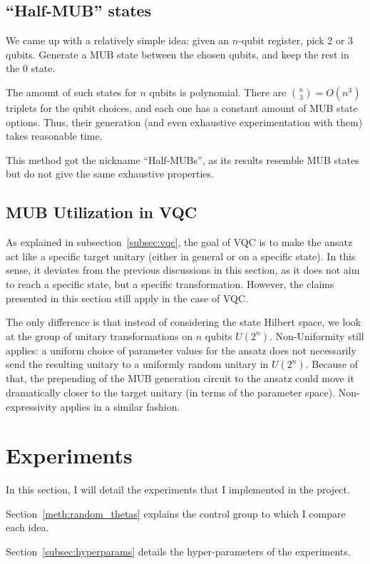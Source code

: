 \documentclass[a4paper,12pt]{article}
\begin{document}
\subsection{``Half-MUB'' states} \label{meth:half_mub}
We came up with a relatively simple idea: given an $n$-qubit register, pick 2 or 3 qubits. Generate a MUB state between the chosen qubits, and keep the rest in the 0 state.

The amount of such states for $n$ qubits is polynomial. There are ${n \choose 3} = O(n^3)$ triplets for the qubit choices, and each one has a constant amount of MUB state options.
Thus, their generation (and even exhaustive experimentation with them) takes reasonable time.

This method got the nickname ``Half-MUBs'', as its results resemble MUB states but do not give the same exhaustive properties.

\subsection{MUB Utilization in VQC} \label{subsec:mub_vqc}
As explained in subsection~\ref{subsec:vqc}, the goal of VQC is to make the ansatz act like a specific target unitary (either in general or on a specific state).
In this sense, it deviates from the previous discussions in this section, as it does not aim to reach a specific state, but a specific transformation.
However, the claims presented in this section still apply in the case of VQC.

The only difference is that instead of considering the state Hilbert space, we look at the group of unitary transformations on $n$ qubits $U(2^n)$.
Non-Uniformity still applies: a uniform choice of parameter values for the ansatz does not necessarily send the resulting unitary to a uniformly random unitary in $U(2^n)$.
Because of that, the prepending of the MUB generation circuit to the ansatz could move it dramatically closer to the target unitary (in terms of the parameter space).
Non-expressivity applies in a similar fashion.

\section{Experiments} \label{sec:experiments}
In this section, I will detail the experiments that I implemented in the project.

Section~\ref{meth:random_thetas} explains the control group to which I compare each idea.

Section~\ref{subsec:hyperparams} details the hyper-parameters of the experiments.
\end{document}
